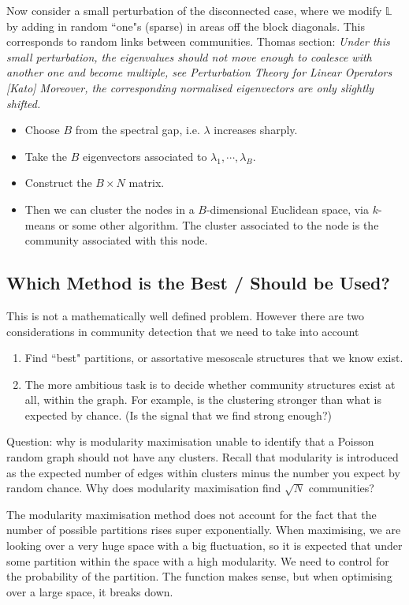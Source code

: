 \documentclass[12pt]{article}
\theoremstyle{definition}
\begin{document}
Now consider a small perturbation of the disconnected case, where we modify $\mathbb{L}$ by adding in random ``one"s (sparse) in areas off the block diagonals. This corresponds to random links between communities. Thomas section: \textit{Under this small perturbation, the eigenvalues should not move enough to coalesce with another one and become multiple, see Perturbation Theory for Linear Operators [Kato] Moreover, the corresponding normalised eigenvectors are only slightly shifted.}

\begin{itemize}
    \item Choose $B$ from the spectral gap, i.e. $\lambda$ increases sharply. 
    \item Take the $B$ eigenvectors associated to $\lambda_1,\cdots,\lambda_B$. 
    \item Construct the $B\times N$ matrix. 
    \item Then we can cluster the nodes in a $B$-dimensional Euclidean space, via $k$-means or some other algorithm. The cluster associated to the node is the community associated with this node. 
\end{itemize}

\subsection{Which Method is the Best / Should be Used?}
This is not a mathematically well defined problem. However there are two considerations in community detection that we need to take into account
\begin{enumerate}
    \item Find ``best" partitions, or assortative mesoscale structures that we know exist. 
    \item The more ambitious task is to decide whether community structures exist at all, within the graph. For example, is the clustering stronger than what is expected by chance. (Is the signal that we find strong enough?)
\end{enumerate}

Question: why is modularity maximisation unable to identify that a Poisson random graph should not have any clusters. Recall that modularity is introduced as the expected number of edges within clusters minus the number you expect by random chance. Why does modularity maximisation find $\sqrt N$ communities?

The modularity maximisation method does not account for the fact that the number of possible partitions rises super exponentially. When maximising, we are looking over a very huge space with a big fluctuation, so it is expected that under some partition within the space with a high modularity. We need to control for the probability of the partition. The function makes sense, but when optimising over a large space, it breaks down.
\end{document}
